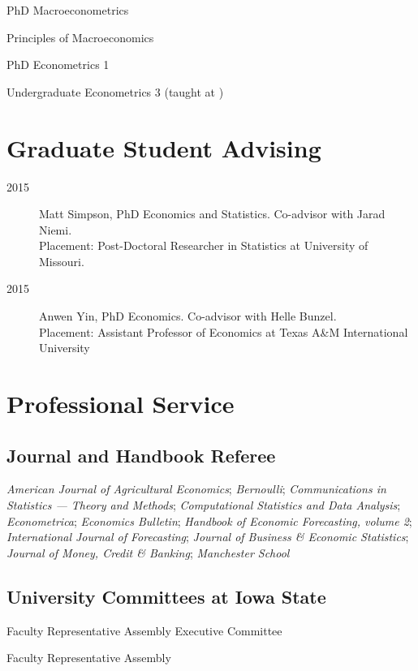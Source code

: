 \documentclass[12pt]{article}%
\newcommand{\allcaps}[1]{\textls{\MakeUppercase{#1}}}
\begin{document}
\begin{description}[noitemsep]
\item[2011 -- present] PhD Macroeconometrics
\item[2010 -- present] Principles of Macroeconomics
\item[2009 -- present] PhD Econometrics 1
\item[2009] Undergraduate Econometrics 3 (taught at \allcaps{UCSD})
\end{description}

\section*{Graduate Student Advising}
\begin{description}
\item[2015] Matt Simpson, PhD Economics and Statistics.  Co-advisor
with Jarad Niemi. \\
Placement: Post-Doctoral Researcher in Statistics at University of Missouri.
\item[2015] Anwen Yin, PhD Economics. Co-advisor with Helle Bunzel. \\
Placement: Assistant Professor of Economics at Texas A\&M
International University
\end{description}

\section*{Professional Service}

\subsection*{Journal and Handbook Referee}
\textit{American Journal of Agricultural Economics};
\textit{Bernoulli};
\textit{Communications in Statistics --- Theory and Methods};
\textit{Computational Statistics and Data Analysis};
\textit{Econometrica};
\textit{Economics Bulletin};
\textit{Handbook of Economic Forecasting, volume 2};
\textit{International Journal of Forecasting};
\textit{Journal of Business \& Economic Statistics};
\textit{Journal of Money, Credit \& Banking};
\textit{Manchester School}

\subsection*{University Committees at Iowa State}

\begin{description}[noitemsep]
\item[2014 -- present] Faculty Representative Assembly Executive
Committee
\item[2013 -- present] Faculty Representative Assembly
\end{description}
\end{document}

